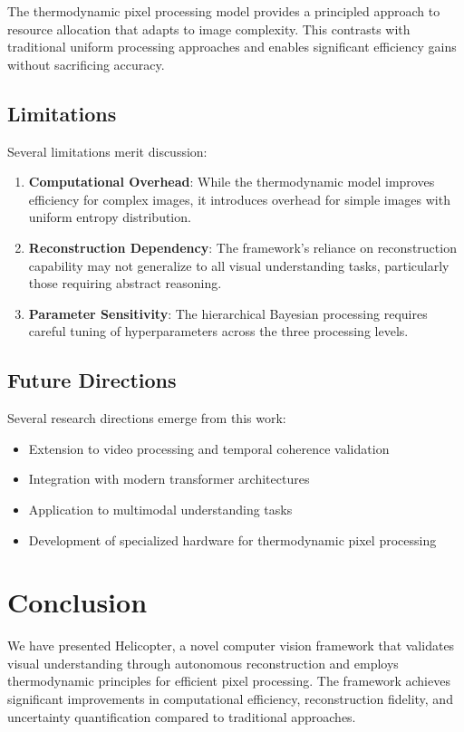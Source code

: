 \documentclass[12pt,a4paper]{article}
\begin{document}
The thermodynamic pixel processing model provides a principled approach to resource allocation that adapts to image complexity. This contrasts with traditional uniform processing approaches and enables significant efficiency gains without sacrificing accuracy.

\subsection{Limitations}

Several limitations merit discussion:

\begin{enumerate}
\item \textbf{Computational Overhead}: While the thermodynamic model improves efficiency for complex images, it introduces overhead for simple images with uniform entropy distribution.
\item \textbf{Reconstruction Dependency}: The framework's reliance on reconstruction capability may not generalize to all visual understanding tasks, particularly those requiring abstract reasoning.
\item \textbf{Parameter Sensitivity}: The hierarchical Bayesian processing requires careful tuning of hyperparameters across the three processing levels.
\end{enumerate}

\subsection{Future Directions}

Several research directions emerge from this work:

\begin{itemize}
\item Extension to video processing and temporal coherence validation
\item Integration with modern transformer architectures
\item Application to multimodal understanding tasks
\item Development of specialized hardware for thermodynamic pixel processing
\end{itemize}

\section{Conclusion}

We have presented Helicopter, a novel computer vision framework that validates visual understanding through autonomous reconstruction and employs thermodynamic principles for efficient pixel processing. The framework achieves significant improvements in computational efficiency, reconstruction fidelity, and uncertainty quantification compared to traditional approaches.
\end{document}
